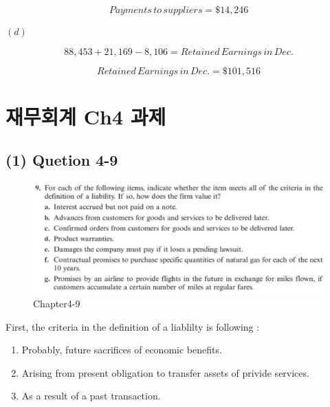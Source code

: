 \documentclass[
  letterpaper,
  DIV=11,
  numbers=noendperiod]{scrreprt}
\providecommand{\tightlist}{%
  \setlength{\itemsep}{0pt}\setlength{\parskip}{0pt}}\usepackage{longtable,booktabs,array}
\begin{document}
\[Payments\,to\,suppliers=\$14,246\]

\textbf{\((d)\)}

\[88,453+21,169-8,106=Retained\,Earnings\,in\,Dec.\]

\[Retained\,Earnings\,in\,Dec.=\$101,516\]

\chapter*{재무회계 Ch4
과제}\label{uxc7acuxbb34uxd68cuxacc4-ch4-uxacfcuxc81c}


\section*{(1) Quetion 4-9}\label{quetion-4-9}


\begin{figure}[H]

{\centering \includegraphics{images/재무회계_4-9.png}

}

\caption{Chapter4-9}

\end{figure}%

First, the criteria in the definition of a liablilty is following :

\begin{enumerate}
\def\labelenumi{(\arabic{enumi})}
\tightlist
\item
  Probably, future sacrifices of economic benefits.
\item
  Arising from present obligation to transfer assets of privide
  services.
\item
  As a result of a past transaction.
\end{enumerate}
\end{document}
